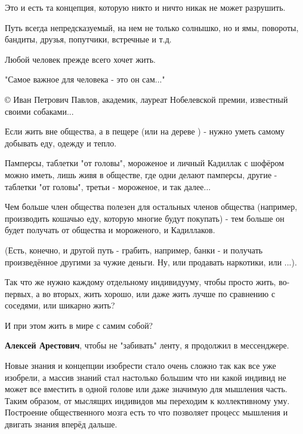 \begin{itemize}
Это и есть та концепция, которую никто и ничто никак не может разрушить.

Путь всегда непредсказуемый, на нем не только солнышко, но и ямы, повороты,
бандиты, друзья, попутчики, встречные и т.д.


Любой человек прежде всего хочет жить.

"Самое важное для человека - это он сам..."

© Иван Петрович Павлов, академик, лауреат Нобелевской премии, известный своими
собаками... \Smiley[1.0][yellow]

Если жить вне общества, а в пещере (или на дереве \Smiley[1.0][yellow] ) - нужно уметь самому
добывать еду, одежду и тепло.

Памперсы, таблетки "от головы", мороженое и личный Кадиллак с шофёром можно
иметь, лишь живя в обществе, где одни делают памперсы, другие - таблетки "от
головы", третьи - мороженое, и так далее...

Чем больше член общества полезен для остальных членов общества (например,
производить кошачью еду, которую многие будут покупать) - тем больше он будет
получать от общества и мороженого, и Кадиллаков.

(Есть, конечно, и другой путь - грабить, например, банки - и получать
произведённое другими за чужие деньги. Ну, или продавать наркотики, или ...).

Так что же нужно каждому отдельному индивидууму, чтобы просто жить, во-первых,
а во вторых, жить хорошо, или даже жить лучше по сравнению с соседями, или
шикарно жить?

И при этом жить в мире с самим собой?

\textbf{Алексей Арестович}, чтобы не "забивать" ленту, я продолжил в мессенджере.


Новые знания и концепции изобрести стало очень сложно так как все уже изобрели,
а массив знаний стал настолько большим что ни какой индивид не может все
вместить в одной голове или даже значимую для мышления часть. Таким образом, от
мыслящих индивидов мы переходим к коллективному уму. Построение общественного
мозга есть то что позволяет процесс мышления и двигать знания вперёд дальше.


\end{itemize}
